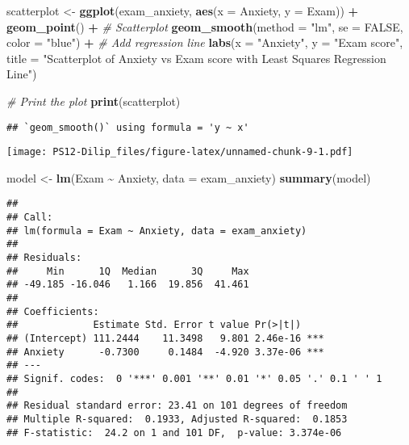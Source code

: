 \documentclass[
]{article}
\newenvironment{Shaded}{\begin{snugshade}}{\end{snugshade}}
\newcommand{\AttributeTok}[1]{\textcolor[rgb]{0.13,0.29,0.53}{#1}}
\newcommand{\CommentTok}[1]{\textcolor[rgb]{0.56,0.35,0.01}{\textit{#1}}}
\newcommand{\ConstantTok}[1]{\textcolor[rgb]{0.56,0.35,0.01}{#1}}
\newcommand{\FunctionTok}[1]{\textcolor[rgb]{0.13,0.29,0.53}{\textbf{#1}}}
\newcommand{\NormalTok}[1]{#1}
\newcommand{\OtherTok}[1]{\textcolor[rgb]{0.56,0.35,0.01}{#1}}
\newcommand{\SpecialCharTok}[1]{\textcolor[rgb]{0.81,0.36,0.00}{\textbf{#1}}}
\newcommand{\StringTok}[1]{\textcolor[rgb]{0.31,0.60,0.02}{#1}}
\begin{document}
\begin{Shaded}
\begin{Highlighting}[]
\NormalTok{scatterplot }\OtherTok{\textless{}{-}} \FunctionTok{ggplot}\NormalTok{(exam\_anxiety, }\FunctionTok{aes}\NormalTok{(}\AttributeTok{x =}\NormalTok{ Anxiety, }\AttributeTok{y =}\NormalTok{ Exam)) }\SpecialCharTok{+}
  \FunctionTok{geom\_point}\NormalTok{() }\SpecialCharTok{+}  \CommentTok{\# Scatterplot}
  \FunctionTok{geom\_smooth}\NormalTok{(}\AttributeTok{method =} \StringTok{"lm"}\NormalTok{, }\AttributeTok{se =} \ConstantTok{FALSE}\NormalTok{, }\AttributeTok{color =} \StringTok{"blue"}\NormalTok{) }\SpecialCharTok{+}  \CommentTok{\# Add regression line}
  \FunctionTok{labs}\NormalTok{(}\AttributeTok{x =} \StringTok{"Anxiety"}\NormalTok{, }\AttributeTok{y =} \StringTok{"Exam score"}\NormalTok{, }\AttributeTok{title =} \StringTok{"Scatterplot of Anxiety vs Exam score with Least Squares Regression Line"}\NormalTok{)}

\CommentTok{\# Print the plot}
\FunctionTok{print}\NormalTok{(scatterplot)}
\end{Highlighting}
\end{Shaded}

\begin{verbatim}
## `geom_smooth()` using formula = 'y ~ x'
\end{verbatim}

\texttt{[image: PS12-Dilip\_files/figure-latex/unnamed-chunk-9-1.pdf]}

\begin{Shaded}
\begin{Highlighting}[]
\NormalTok{model }\OtherTok{\textless{}{-}} \FunctionTok{lm}\NormalTok{(Exam }\SpecialCharTok{\textasciitilde{}}\NormalTok{ Anxiety, }\AttributeTok{data =}\NormalTok{ exam\_anxiety)}
\FunctionTok{summary}\NormalTok{(model)}
\end{Highlighting}
\end{Shaded}

\begin{verbatim}
## 
## Call:
## lm(formula = Exam ~ Anxiety, data = exam_anxiety)
## 
## Residuals:
##     Min      1Q  Median      3Q     Max 
## -49.185 -16.046   1.166  19.856  41.461 
## 
## Coefficients:
##             Estimate Std. Error t value Pr(>|t|)    
## (Intercept) 111.2444    11.3498   9.801 2.46e-16 ***
## Anxiety      -0.7300     0.1484  -4.920 3.37e-06 ***
## ---
## Signif. codes:  0 '***' 0.001 '**' 0.01 '*' 0.05 '.' 0.1 ' ' 1
## 
## Residual standard error: 23.41 on 101 degrees of freedom
## Multiple R-squared:  0.1933, Adjusted R-squared:  0.1853 
## F-statistic:  24.2 on 1 and 101 DF,  p-value: 3.374e-06
\end{verbatim}
\end{document}
